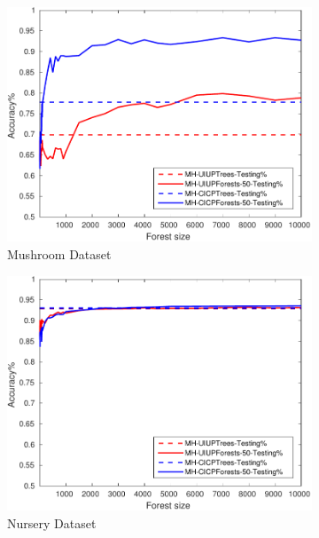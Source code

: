 \begin{figure}[ht]
  \begin{subfigure}[b]{0.3\textwidth}
		\centering
  	\includegraphics[width=\textwidth]{figs/PLPTF/Forests/MushroomDownsampled_Forests_MH.pdf}
  	\caption{Mushroom Dataset}
		\label{fig:Mush4}
	\end{subfigure}
  \begin{subfigure}[b]{0.3\textwidth}
		\centering
  	\includegraphics[width=\textwidth]{figs/PLPTF/Forests/NurseryDownsampledFurther_Forests_MH.pdf}
  	\caption{Nursery Dataset}
		\label{fig:N4}
	\end{subfigure}
  \begin{subfigure}[b]{0.3\textwidth}
		\centering

\end{subfigure}
\end{figure}
